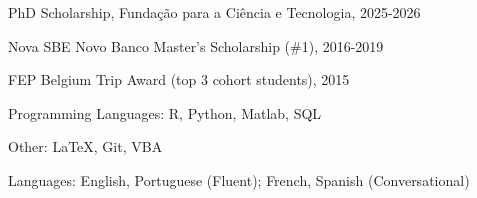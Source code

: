 \documentclass{practical-resume}
\begin{document}
\begin{position}{}{}{}
	\item PhD Scholarship, Fundação para a Ciência e Tecnologia, 2025-2026
	\item Nova SBE Novo Banco Master's Scholarship (\#1), 2016-2019
	\item FEP Belgium Trip Award (top 3 cohort students), 2015
\end{position}
	
\vspace{-1em}
	Programming Languages: R, Python, Matlab, SQL
	
	Other: \LaTeX, Git, VBA
	
	Languages: English, Portuguese (Fluent); French, Spanish (Conversational)
		
\end{document}
